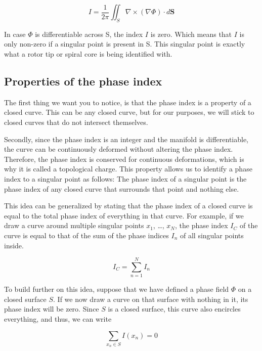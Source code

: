 \documentclass[twocolumn]{article}
\begin{document}
\begin{equation}
  I = \frac{1}{2\pi} \iint_S \nabla \times (\nabla \Phi) \cdot d\bm{S}
  \label{eq:phase-index-stokes}
\end{equation}

\noindent In case \(\Phi\) is differentiable across S, the index \(I\) is zero.
Which means that \(I\) is only non-zero if a singular point is present
in S. \autocite{herlin2012reconstruction} This singular point is exactly
what a rotor tip or spiral core is being identified with.

\subsection{Properties of the phase
index}\label{properties-of-the-phase-index}

The first thing we want you to notice, is that the phase index is a
property of a closed curve. This can be any closed curve, but for our
purposes, we will stick to closed curves that do not intersect
themselves.

Secondly, since the phase index is an integer and the manifold is
differentiable, the curve can be continuously deformed without altering
the phase index. Therefore, the phase index is conserved for continuous
deformations, which is why it is called a topological charge. This
property allows us to identify a phase index to a singular point as
follows: The phase index of a singular point is the phase index of any
closed curve that surrounds that point and nothing else.

This idea can be generalized by stating that the phase index of a closed
curve is equal to the total phase index of everything in that curve. For
example, if we draw a curve around multiple singular points \(x_1\),
\ldots, \(x_N\), the phase index \(I_C\) of the curve is equal to that
of the sum of the phase indices \(I_n\) of all singular points inside.

\begin{equation}
  I_C = \sum^N_{n=1} I_n
  \label{eq:index-curve}
\end{equation}

\noindent To build further on this idea, suppose that we have defined a phase
field \(\Phi\) on a closed surface \(S\). If we now draw a curve on that
surface with nothing in it, its phase index will be zero. Since \(S\) is
a closed surface, this curve also encircles everything, and thus, we can
write

\begin{equation}
  \sum_{x_n \in S} I(x_n) = 0
  \label{eq:index-theorem}
\end{equation}
\end{document}

